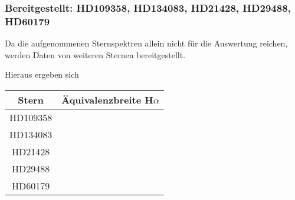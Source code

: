 \subsubsection{Bereitgestellt: HD109358, HD134083, HD21428, HD29488, HD60179}
Da die aufgenommenen Sternspektren allein nicht für die Auswertung reichen, werden Daten von weiteren Sternen bereitgestellt.

Hieraus ergeben sich
\begin{table}[h]
  \begin{tabular}{cc}
    \toprule
    Stern & Äquivalenzbreite H$\alpha $\\
    \midrule
    HD109358 & \\
    HD134083 & \\
    HD21428 & \\
    HD29488 & \\
    HD60179 & \\
    \bottomrule
  \end{tabular}
\end{table}
